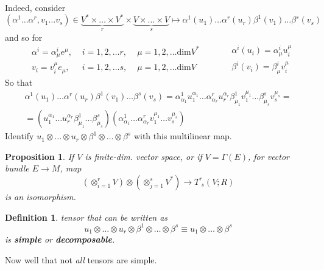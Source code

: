\documentclass[10pt]{amsart}
\newtheorem{proposition}{Proposition}
\newtheorem{definition}{Definition}
\begin{document}
\begin{multicols*}{2}
Indeed, consider 
\[
(\alpha^1 \dots \alpha^r, v_1 \dots v_s) \in \underbrace{V^* \times \dots \times V^* }_{r} \times \underbrace{ V\times \dots \times V}_{s} \mapsto \alpha^1(u_1) \dots \alpha^r(u_r) \beta^1(v_1) \dots \beta^s(v_s)
\]
and so for 
\[
\begin{aligned}
	& \alpha^i = \alpha^i_{\mu} e^{\mu} , \, & \, i =1,2, \dots r, \, & \, \mu = 1,2, \dots \text{dim}V^* \\ 
	& v_i = v_i^{\mu} e_{\mu} , \, & \, i = 1,2, \dots s, \, & \, \mu = 1, 2, \dots \text{dim}V 
\end{aligned} \qquad \, \begin{aligned}
& \alpha^i(u_i) = \alpha^i_{\mu} u^{\mu}_i \\ 
 & \beta^i(v_i) = \beta^i_{\mu} v^{\mu}_i
\end{aligned}
\]
So that 
\[
\begin{gathered}
	\alpha^1(u_1) \dots \alpha^r(u_r) \beta^1(v_1) \dots \beta^s(v_s) = \alpha^1_{\alpha_1}u^{\alpha_1}_1 \dots \alpha^r_{\alpha_r} u^{\alpha_r}_r \beta^1_{\mu_1} v^{\mu_1}_1 \dots \beta^s_{\mu_s} v^{\mu_s}_s = \\
	= (u^{\alpha_1}_1 \dots u_r^{\alpha_r} \beta^1_{\mu_1} \dots \beta^s_{\mu_s})(\alpha^1_{\alpha_1} \dots \alpha^r_{\alpha_r} v_1^{\mu_1} \dots v_s^{\mu_s} )
\end{gathered}
\]
Identify $u_1 \otimes \dots \otimes u_r \otimes \beta^1 \otimes \dots \otimes \beta^s$ with this multilinear map.  

\begin{proposition}
If $V$ is finite-dim. vector space, or if $V=\Gamma(E)$, for vector bundle $E\to M$, map
\begin{equation}
\left( \otimes_{i=1}^r V \right)  \otimes \left( \otimes_{j=1}^s V^* \right) \to T^r_{ \, \, s}(V;R)
\end{equation}
is an isomorphism.  
\end{proposition}

\begin{definition}
tensor that can be written as 
\begin{equation}
u_1\otimes \dots \otimes u_r \otimes \beta^1 \otimes \dots \otimes \beta^s \equiv u_1\otimes \dots \otimes \beta^s 
\end{equation}
is \textbf{simple} or \textbf{decomposable}.  
\end{definition}
Now well that not \emph{all} tensors are simple.  


\end{multicols*}
\end{document}
